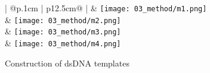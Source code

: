 		\begin{comment}
				\begin{figure}[h]
					\texttt{[image: 01\_schematics/aseq.png]} 
					\caption{schematic}
					\label{fig:schematic}
				\end{figure}
		\end{comment}
		\begin{figure}[H]
			\begin{table}[H]
				\centering
				\begin{tabular}{{  | @{}p{.1cm} | p{12.5cm}@{} |   }}				
					\toprule
					 & \texttt{[image: 03\_method/m1.png]} 
					\\ \midrule\midrule\midrule\midrule  %
					 & \texttt{[image: 03\_method/m2.png]} 
					\\ \midrule\midrule\midrule\midrule  
					 & \texttt{[image: 03\_method/m3.png]}  
					\\ \midrule\midrule\midrule\midrule  
					 & \texttt{[image: 03\_method/m4.png]} 
					\\ \bottomrule
				\end{tabular}
			\end{table}		
			\caption{Construction of dsDNA templates}
			\label{fig:method}	
		\end{figure}

		

